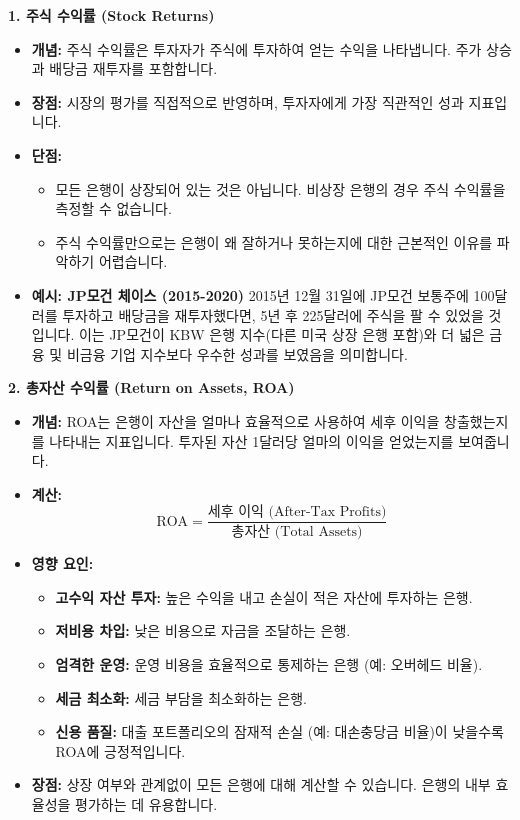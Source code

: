 \documentclass[11pt,a4paper]{article}
\begin{document}
\textbf{1. 주식 수익률 (Stock Returns)}
\begin{itemize}
    \item \textbf{개념:} 주식 수익률은 투자자가 주식에 투자하여 얻는 수익을 나타냅니다. 주가 상승과 배당금 재투자를 포함합니다.
    \item \textbf{장점:} 시장의 평가를 직접적으로 반영하며, 투자자에게 가장 직관적인 성과 지표입니다.
    \item \textbf{단점:}
        \begin{itemize}
            \item 모든 은행이 상장되어 있는 것은 아닙니다. 비상장 은행의 경우 주식 수익률을 측정할 수 없습니다.
            \item 주식 수익률만으로는 은행이 왜 잘하거나 못하는지에 대한 근본적인 이유를 파악하기 어렵습니다.
        \end{itemize}
    \item \textbf{예시: JP모건 체이스 (2015-2020)}
        2015년 12월 31일에 JP모건 보통주에 100달러를 투자하고 배당금을 재투자했다면, 5년 후 225달러에 주식을 팔 수 있었을 것입니다. 이는 JP모건이 KBW 은행 지수(다른 미국 상장 은행 포함)와 더 넓은 금융 및 비금융 기업 지수보다 우수한 성과를 보였음을 의미합니다.
\end{itemize}

\textbf{2. 총자산 수익률 (Return on Assets, ROA)}
\begin{itemize}
    \item \textbf{개념:} ROA는 은행이 자산을 얼마나 효율적으로 사용하여 세후 이익을 창출했는지를 나타내는 지표입니다. 투자된 자산 1달러당 얼마의 이익을 얻었는지를 보여줍니다.
    \item \textbf{계산:}
    \begin{equation*}
        \text{ROA} = \frac{\text{세후 이익 (After-Tax Profits)}}{\text{총자산 (Total Assets)}}
    \end{equation*}
    \item \textbf{영향 요인:}
        \begin{itemize}
            \item \textbf{고수익 자산 투자:} 높은 수익을 내고 손실이 적은 자산에 투자하는 은행.
            \item \textbf{저비용 차입:} 낮은 비용으로 자금을 조달하는 은행.
            \item \textbf{엄격한 운영:} 운영 비용을 효율적으로 통제하는 은행 (예: 오버헤드 비율).
            \item \textbf{세금 최소화:} 세금 부담을 최소화하는 은행.
            \item \textbf{신용 품질:} 대출 포트폴리오의 잠재적 손실 (예: 대손충당금 비율)이 낮을수록 ROA에 긍정적입니다.
        \end{itemize}
    \item \textbf{장점:} 상장 여부와 관계없이 모든 은행에 대해 계산할 수 있습니다. 은행의 내부 효율성을 평가하는 데 유용합니다.
\end{itemize}
\end{document}
